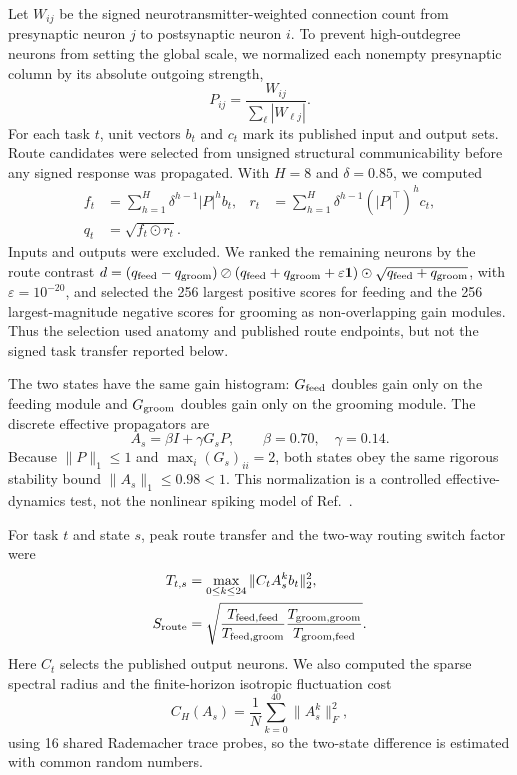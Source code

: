 \documentclass[
  aps,prl,preprint,notitlepage,superscriptaddress,nofootinbib,longbibliography,
  amsmath,amssymb
]{revtex4-2}
\begin{document}
Let $W_{ij}$ be the signed neurotransmitter-weighted connection count from
presynaptic neuron $j$ to postsynaptic neuron $i$.  To prevent high-outdegree
neurons from setting the global scale, we normalized each nonempty presynaptic
column by its absolute outgoing strength,
\begin{equation}
P_{ij}=\frac{W_{ij}}{\sum_\ell |W_{\ell j}|}.
\label{eq:s-flywire-normalization}
\end{equation}
For each task $t$, unit vectors $b_t$ and $c_t$ mark its published input and
output sets.  Route candidates were selected from unsigned structural
communicability before any signed response was propagated.  With $H=8$ and
$\delta=0.85$, we computed
\begin{align}
f_t&=\sum_{h=1}^{H}\delta^{h-1}|P|^h b_t, &
r_t&=\sum_{h=1}^{H}\delta^{h-1}(|P|^\top)^h c_t,\\
q_t&=\sqrt{f_t\odot r_t}.
\label{eq:s-flywire-corridor}
\end{align}
Inputs and outputs were excluded.  We ranked the remaining neurons by the
route contrast
$d=(q_{\rm feed}-q_{\rm groom})\oslash
(q_{\rm feed}+q_{\rm groom}+\varepsilon\mathbf 1)\odot
\sqrt{q_{\rm feed}+q_{\rm groom}}$, with $\varepsilon=10^{-20}$, and selected
the 256 largest positive scores
for feeding and the 256 largest-magnitude negative scores for grooming as
non-overlapping gain modules.  Thus the
selection used anatomy and published route endpoints, but not the signed task
transfer reported below.

The two states have the same gain histogram: $G_{\rm feed}$ doubles gain only
on the feeding module and $G_{\rm groom}$ doubles gain only on the grooming
module.  The discrete effective propagators are
\begin{equation}
A_s=\beta I+\gamma G_sP,\qquad \beta=0.70,\quad\gamma=0.14.
\label{eq:s-flywire-propagator}
\end{equation}
Because $\|P\|_1\le1$ and $\max_i(G_s)_{ii}=2$, both states obey the same
rigorous stability bound $\|A_s\|_1\le0.98<1$.  This normalization is a
controlled effective-dynamics test, not the nonlinear spiking model of
Ref.~\cite{shiu2024}.

For task $t$ and state $s$, peak route transfer and the two-way routing switch
factor were
\begin{align}
T_{t,s}&=\max_{0\le k\le24}\|C_tA_s^kb_t\|_2^2,\\
S_{\rm route}&=\sqrt{
\frac{T_{\rm feed,feed}}{T_{\rm feed,groom}}
\frac{T_{\rm groom,groom}}{T_{\rm groom,feed}}}.
\label{eq:s-flywire-switch}
\end{align}
Here $C_t$ selects the published output neurons.  We also computed the sparse
spectral radius and the finite-horizon isotropic fluctuation cost
\begin{equation}
C_H(A_s)=\frac{1}{N}\sum_{k=0}^{40}\|A_s^k\|_F^2,
\label{eq:s-flywire-cost}
\end{equation}
using 16 shared Rademacher trace probes, so the two-state difference is estimated
with common random numbers.
\end{document}
